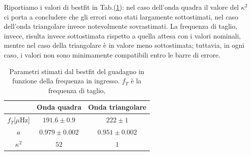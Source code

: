 \documentclass{article}
\begin{document}
        \noindent Riportiamo i valori di bestfit in Tab.(\ref{tab:results}): nel caso dell'onda quadra il valore del $\kappa^2$ ci porta a concludere che gli errori sono stati largamente sottostimati, nel caso dell'onda triangolare invece notevolmente sovrastimati. La frequenza di taglio, invece, risulta invece sottostimata
        rispetto a quella attesa con i valori nominali, mentre nel caso della triangolare è in valore meno sottostimata; tuttavia, in ogni caso, i valori non sono minimamente compatibili entro le barre di errore. 
        \begin{table}[H]
            \centering
            \begin{tabular}{ccc}
                \hline
                            &Onda quadra        & Onda triangolare\\
                \hline
                $f_T$[$\mu$Hz]  &$191.6\pm0.9$      & $222\pm1$\\
                $a$         &$0.979\pm0.002$    &   $0.951\pm0.002$\\
                $\kappa^2$        & $52   $             &   $1$ \\
            
                \hline
            \end{tabular}
            \caption{Parametri stimati dal bestfit del guadagno in funzione della frequenza in ingresso. $f_T$ è la frequenza di taglio, }
            \label{tab:results}
        \end{table}
        
        
\end{document}
